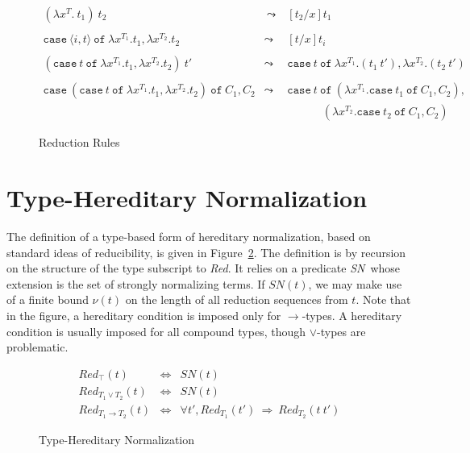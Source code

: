 \documentclass{article}
\newcommand{\red}[0]{\textit{Red}}
\newcommand{\sn}[0]{\textit{SN}}
\newcommand{\To}{\Rightarrow}
\begin{document}
\begin{figure}[p]
\begin{eqnarray*}
(\lambda x^T.\ t_1)\ t_2 & \ \leadsto\  & [t_2/x]t_1 \\ \\
\texttt{case}\ \langle i, t \rangle\ \texttt{of}\ \lambda x^{T_1}. t_1, \lambda x^{T_2}. t_2 & \leadsto & 
  [t/x]t_i \\ \\
(\texttt{case}\ t\ \texttt{of}\ \lambda x^{T_1}.t_1,\lambda x^{T_2}.t_2)\ t' & \leadsto & 
  \texttt{case}\ t\ \texttt{of}\ \lambda x^{T_1}.(t_1\ t'), \lambda x^{T_2}.(t_2\ t') \\ \\
\texttt{case}\ (\texttt{case}\ t\ \texttt{of}\ \lambda x^{T_1}.t_1,\lambda x^{T_2}.t_2) \ \texttt{of}\ 
C_1,C_2 & \leadsto & 
\texttt{case}\ t\ \texttt{of}\ (\lambda x^{T_1}.\texttt{case}\ t_1\ \texttt{of}\ C_1, C_2),\\
\ &\ &
\ \ \ \ \ \ \ \ \ \ \ \ \ \ (\lambda x^{T_2}.\texttt{case}\ t_2\ \texttt{of}\ C_1, C_2)
\end{eqnarray*}
\caption{\label{fig:red}Reduction Rules}
\end{figure}

\section{Type-Hereditary Normalization}

The definition of a type-based form of hereditary normalization, based
on standard ideas of reducibility, is given in
Figure~\ref{fig:type-hn}.  The definition is by recursion on the
structure of the type subscript to \red.  It relies on a predicate
\sn\ whose extension is the set of strongly normalizing terms.  If
$\sn(t)$, we may make use of a finite bound $\nu(t)$ on the length of
all reduction sequences from $t$.  Note that in the figure, a
hereditary condition is imposed only for $\to$-types.  A hereditary
condition is usually imposed for all compound types, though
$\vee$-types are problematic.

\begin{figure}[p]
\begin{eqnarray*}
\red_{\top}(t) & \Leftrightarrow & \sn(t) \\
\red_{T_1\vee T_2}(t) & \Leftrightarrow & \sn(t) \\
\red_{T_1\to T_2}(t) & \Leftrightarrow & \forall t', \red_{T_1}(t')\ \To\ \red_{T_2}(t\ t')
\end{eqnarray*}
\caption{\label{fig:type-hn} Type-Hereditary Normalization}
\end{figure}
\end{document}
